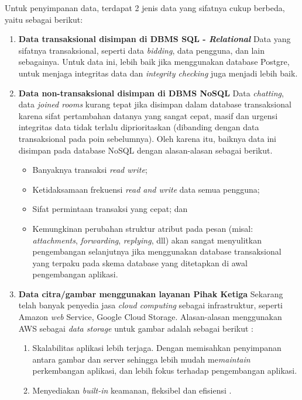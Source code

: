 	Untuk penyimpanan data, terdapat 2 jenis data yang sifatnya cukup berbeda, yaitu sebagai berikut:
	\begin{enumerate}
		\item \textbf{Data transaksional disimpan di DBMS SQL - \textit{Relational}}
		\newline
		\indent Data yang sifatnya transaksional, seperti data \textit{bidding}, data pengguna, dan lain sebagainya.
		Untuk data ini, lebih baik jika menggunakan database Postgre, untuk menjaga integritas data dan \textit{integrity checking} juga  menjadi lebih baik.
		\item \textbf{Data non-transaksional disimpan di DBMS NoSQL}
		\newline
		\indent Data \textit{chatting}, data \textit{joined rooms} kurang tepat jika disimpan dalam database transaksional karena sifat pertambahan datanya yang sangat cepat, masif dan urgensi integritas data tidak terlalu diprioritaskan (dibanding dengan data transaksional pada poin sebelumnya). Oleh karena itu, baiknya data ini disimpan pada database NoSQL dengan alasan-alasan sebagai berikut.
		\begin{itemize} 
			\item Banyaknya transaksi \textit{read write};
			\item Ketidaksamaan frekuensi \textit{read and write} data semua pengguna;
			\item Sifat permintaan transaksi yang cepat; dan
			\item Kemungkinan perubahan struktur atribut pada pesan (misal: \textit{attachments}, \textit{forwarding}, \textit{replying}, dll) akan sangat menyulitkan pengembangan selanjutnya jika menggunakan database transaksional yang terpaku pada skema database yang ditetapkan di awal pengembangan aplikasi.
		\end{itemize} 	
		
		\item \textbf{Data citra/gambar menggunakan layanan Pihak Ketiga} \newline
		\indent Sekarang telah banyak penyedia jasa \textit{cloud computing} sebagai infrastruktur, seperti Amazon \textit{web} Service, Google Cloud Storage. Alasan-alasan menggunakan AWS sebagai \textit{data storage} untuk gambar adalah sebagai berikut :
		\begin{enumerate}[noitemsep,topsep=0pt]
			\item Skalabilitas aplikasi lebih terjaga. 
			\newline Dengan memisahkan penyimpanan antara gambar dan server sehingga lebih mudah me\textit{maintain} perkembangan aplikasi, dan lebih fokus terhadap pengembangan aplikasi.
			\item Menyediakan \textit{built-in} keamanan, fleksibel dan efisiensi \cite{wikipedia_amazon_2016}.
		\end{enumerate}
		

\end{enumerate}
